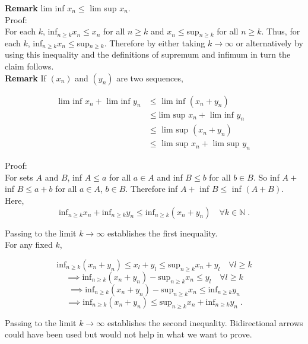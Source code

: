 \documentclass[a4paper]{article}
\begin{document}
\textbf{Remark} lim inf $x_n \leq $ lim sup $x_n$.\\

Proof:\\

For each $k$, inf$_{n\geq k} x_n \leq x_n$ for all $n\geq k$ and $x_n \leq $sup$_{n\geq k}$ for all $n\geq k$. Thus, for each $k$, inf$_{n\geq k} x_n \leq$sup$_{n\geq k}$. Therefore by either taking $k\rightarrow \infty$ or alternatively by using this inequality and the definitions of supremum and infimum in turn the claim follows. \\


{\bf Remark} If $(x_n)$ and $(y_n)$ are two sequences,

\begin{align*}
\text{lim inf } x_n + \text{ lim inf } y_n &\leq \text{ lim inf }(x_n+y_n)\\
&\leq \text{lim sup } x_n + \text{ lim inf } y_n\\
&\leq \text{ lim sup } (x_n + y_n)\\
&\leq \text{ lim sup }x_n + \text{ lim sup } y_n
\end{align*}

Proof:\\

For sets $A$ and $B$, inf $A \leq a$ for all $a \in A$ and inf $B \leq b$ for all $b \in B$. So inf $A + $ inf $B \leq a+b$ for all $a \in A$, $b \in B$. Therefore inf $A + $ inf $B \leq $ inf $(A+B)$. Here,
$$\text{inf}_{n\geq k} x_n + \text{inf}_{n\geq k} y_n \leq \text{inf}_{n\geq k} (x_n + y_n) \quad \forall k \in \mathbb{N} \;.$$

Passing to the limit $k\rightarrow \infty$ establishes the first inequality. \\

For any fixed $k$,

$$\text{inf}_{n\geq k} (x_n + y_n) \leq x_l + y_l \leq \text{sup}_{n\geq k} x_n + y_l \quad \forall l\geq k$$
$$\implies \text{inf}_{n\geq k} (x_n + y_n) - \text{sup}_{n\geq k} x_n\leq y_l \quad \forall l \geq k$$
$$\implies \text{inf}_{n\geq k} (x_n + y_n) - \text{sup}_{n\geq k} x_n\leq \text{inf}_{n\geq k} y_n$$
$$\implies \text{inf}_{n\geq k} (x_n + y_n) \leq \text{sup}_{n\geq k} x_n + \text{inf}_{n\geq k} y_n \;.$$

Passing to the limit $k\rightarrow \infty$ establishes the second inequality. Bidirectional arrows could have been used but would not help in what we want to prove.\\
\end{document}
